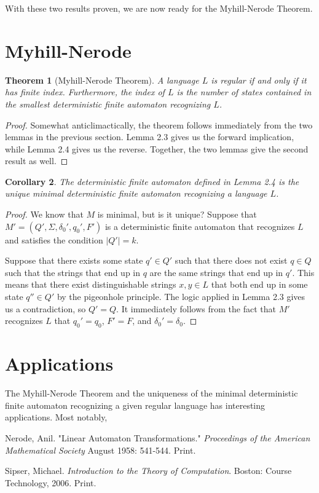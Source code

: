 \documentclass[12pt]{article}
\newtheorem{theorem}{Theorem}[section]
\newtheorem{corollary}[theorem]{Corollary}
\theoremstyle{definition}
\theoremstyle{remark}
\begin{document}
With these two results proven, we are now ready for the Myhill-Nerode Theorem.

\section{Myhill-Nerode}

\begin{theorem}[Myhill-Nerode Theorem]
A language $L$ is regular if and only if it has finite index. Furthermore, the index of $L$ is the number of states contained in the smallest deterministic finite automaton recognizing $L$.
\end{theorem}

\begin{proof}
Somewhat anticlimactically, the theorem follows immediately from the two lemmas in the previous section. Lemma 2.3 gives us the forward implication, while Lemma 2.4 gives us the reverse. Together, the two lemmas give the second result as well.
\end{proof}

\begin{corollary}
The deterministic finite automaton defined in Lemma 2.4 is the unique minimal deterministic finite automaton recognizing a language $L$.
\end{corollary}

\begin{proof}
We know that $M$ is minimal, but is it unique? Suppose that $M'=(Q',\Sigma,\delta_0',q_0',F')$ is a deterministic finite automaton that recognizes $L$ and satisfies the condition $|Q'| = k$.

Suppose that there exists some state $q' \in Q'$ such that there does not exist $q \in Q$ such that the strings that end up in $q$ are the same strings that end up in $q'$. This means that there exist distinguishable strings $x,y \in L$ that both end up in some state $q'' \in Q'$ by the pigeonhole principle. The logic applied
in Lemma 2.3 gives us a contradiction, so $Q'=Q$. It immediately follows from the fact that $M'$ recognizes $L$ that $q_0'=q_0$, $F'=F$, and $\delta_0'=\delta_0$.
\end{proof}

\section{Applications}

The Myhill-Nerode Theorem and the uniqueness of the minimal deterministic finite automaton recognizing a given regular language has interesting applications. Most notably, 



\begin{thebibliography}{9}

Nerode, Anil. "Linear Automaton Transformations." \textit{Proceedings of the American Mathematical Society} August 1958: 541-544. Print.

Sipser, Michael. \textit{Introduction to the Theory of Computation}. Boston: Course Technology, 2006. Print.

\end{thebibliography}
\end{document}
